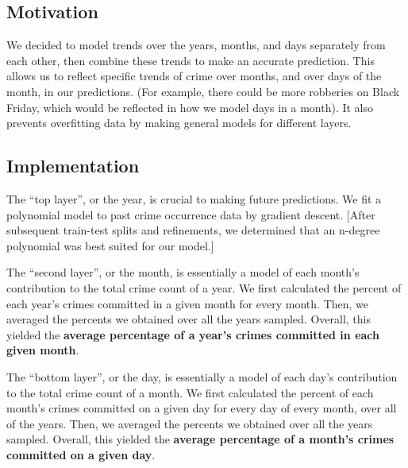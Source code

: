 \documentclass{article}
\begin{document}
\subsection{Motivation}

We decided to model trends over the years, months, and days separately from each other, then combine these trends to make an accurate prediction. This allows us to reflect specific trends of crime over months, and over days of the month, in our predictions. (For example, there could be more robberies on Black Friday, which would be reflected in how we model days in a month). It also prevents overfitting data by making general models for different layers.

\subsection{Implementation}

The ``top layer'', or the year, is crucial to making future predictions. We fit a polynomial model to past crime occurrence data by gradient descent. [After subsequent train-test splits and refinements, we determined that an n-degree polynomial was best suited for our model.] \bigskip 

The ``second layer'', or the month, is essentially a model of each month's contribution to the total crime count of a year. We first calculated the percent of each year's crimes committed in a given month for every month. Then, we averaged the percents we obtained over all the years sampled. Overall, this yielded the \textbf{average percentage of a year's crimes committed in each given month}. \bigskip 

The ``bottom layer'', or the day, is essentially a model of each day's contribution to the total crime count of a month. We first calculated the percent of each month's crimes committed on a given day for every day of every month, over all of the years. Then, we averaged the percents we obtained over all the years sampled. Overall, this yielded the \textbf{average percentage of a month's crimes committed on a given day}. \bigskip 
\end{document}
